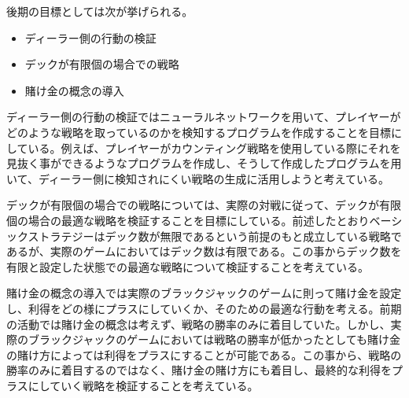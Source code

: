 後期の目標としては次が挙げられる。

\begin{itemize}
\item ディーラー側の行動の検証
\item デックが有限個の場合での戦略
\item 賭け金の概念の導入
\end{itemize}

ディーラー側の行動の検証ではニューラルネットワークを用いて、プレイヤーがどのような戦略を取っているのかを検知するプログラムを作成することを目標にしている。例えば、プレイヤーがカウンティング戦略を使用している際にそれを見抜く事ができるようなプログラムを作成し、そうして作成したプログラムを用いて、ディーラー側に検知されにくい戦略の生成に活用しようと考えている。

デックが有限個の場合での戦略については、実際の対戦に従って、デックが有限個の場合の最適な戦略を検証することを目標にしている。前述したとおりベーシックストラテジーはデック数が無限であるという前提のもと成立している戦略であるが、実際のゲームにおいてはデック数は有限である。この事からデック数を有限と設定した状態での最適な戦略について検証することを考えている。

賭け金の概念の導入では実際のブラックジャックのゲームに則って賭け金を設定し、利得をどの様にプラスにしていくか、そのための最適な行動を考える。前期の活動では賭け金の概念は考えず、戦略の勝率のみに着目していた。しかし、実際のブラックジャックのゲームにおいては戦略の勝率が低かったとしても賭け金の賭け方によっては利得をプラスにすることが可能である。この事から、戦略の勝率のみに着目するのではなく、賭け金の賭け方にも着目し、最終的な利得をプラスにしていく戦略を検証することを考えている。


